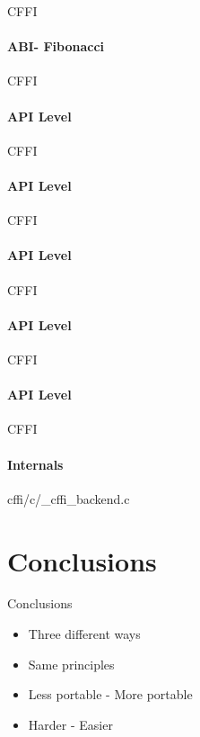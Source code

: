 \documentclass{beamer}
\begin{document}
\begin{frame}{CFFI}
  \framesubtitle{ABI- Fibonacci}
  \begin{block}{}
    \lstcffitwo
  \end{block}
\end{frame}

\begin{frame}{CFFI}
  \framesubtitle{API Level}
  \begin{block}{}
    \lstcffithree
  \end{block}
\end{frame}

\begin{frame}{CFFI}
  \framesubtitle{API Level}
  \begin{block}{}
    \lstcffiusage
  \end{block}
\end{frame}

\begin{frame}{CFFI}
  \framesubtitle{API Level}
  \begin{block}{}
    \lstcffifour
  \end{block}
\end{frame}

\begin{frame}{CFFI}
  \framesubtitle{API Level}
  \begin{block}{}
    \lstcffiboom
  \end{block}
\end{frame}

\begin{frame}{CFFI}
  \framesubtitle{API Level}
  \begin{block}{}
    \lstcffistruct
  \end{block}
\end{frame}

\begin{frame}{CFFI}
  \framesubtitle{Internals}
  \begin{block}{cffi/c/\_cffi\_backend.c}
    \lstcffitripas
  \end{block}
\end{frame}

\section{Conclusions}

\begin{frame}{Conclusions}
  \begin{itemize}
    \item Three different ways
    \item Same principles
    \item Less portable - More portable
    \item Harder - Easier
  \end{itemize}
\end{frame}
\end{document}
